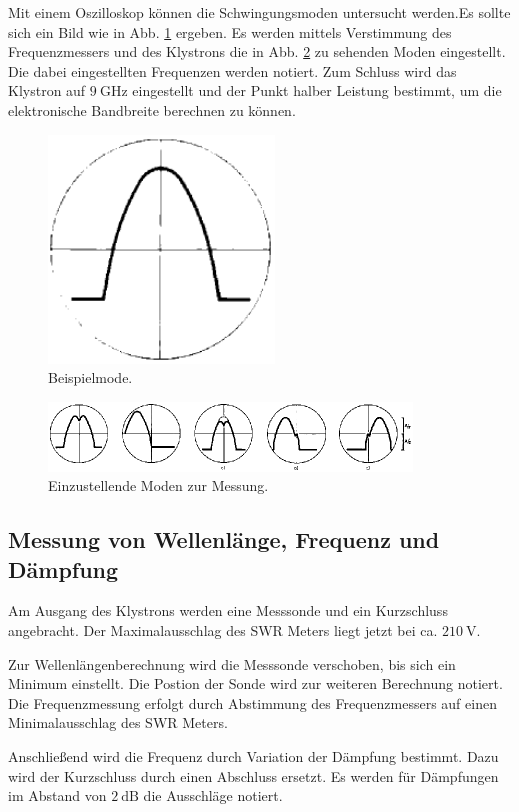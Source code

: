 Mit einem Oszilloskop können die Schwingungsmoden untersucht werden.Es sollte sich ein Bild wie in Abb. \ref{fig:mod} ergeben. Es werden mittels Verstimmung des Frequenzmessers und des Klystrons die in Abb. \ref{fig:mods} zu sehenden Moden eingestellt. Die dabei eingestellten Frequenzen werden notiert.
Zum Schluss wird  das Klystron auf $\SI{9}{\giga\hertz}$ eingestellt und der Punkt halber Leistung bestimmt, um die elektronische Bandbreite berechnen zu können.
\begin{figure}
	\centering
	\includegraphics[width=6cm]{graphics/mod.png}
	\caption{Beispielmode. \cite{skript}}
	\label{fig:mod}
\end{figure}
\begin{figure}
	\centering
	\includegraphics[width=\textwidth]{graphics/mods.png}
	\caption{Einzustellende Moden zur Messung.\cite{skript}}
	\label{fig:mods}
\end{figure}
\subsection{Messung von Wellenlänge, Frequenz und Dämpfung}
Am Ausgang des Klystrons werden eine Messsonde und ein Kurzschluss angebracht. Der Maximalausschlag des SWR Meters liegt jetzt bei ca. $\SI{210}{\volt}$. 

Zur Wellenlängenberechnung wird die Messsonde verschoben, bis sich ein Minimum einstellt. Die Postion der Sonde wird zur weiteren Berechnung notiert. Die Frequenzmessung erfolgt durch Abstimmung des Frequenzmessers auf einen Minimalausschlag des SWR Meters.

Anschließend wird die Frequenz durch Variation der Dämpfung bestimmt. Dazu wird der Kurzschluss durch einen Abschluss ersetzt. Es werden für Dämpfungen im Abstand von $\SI{2}{\deci\bel}$ die Ausschläge notiert.
